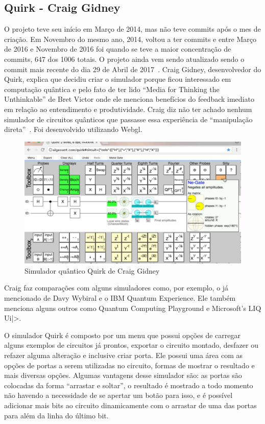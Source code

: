 \documentclass[a4paper, 12pt, oneside]{book}
\begin{document}
\subsection{Quirk - Craig Gidney}

O projeto teve seu início em Março de 2014, mas não teve commits após o mes de criação. Em Novembro do mesmo ano, 2014, voltou a ter commits e entre Março de 2016 e Novembro de 2016 foi quando se teve a maior concentração de commits, 647 dos 1006 totais. O projeto ainda vem sendo atualizado sendo o commit mais recente do dia 29 de Abril de 2017~\cite{gitquirk}. Craig Gidney, desenvolvedor do Quirk, explica que decidiu criar o simulador porque ficou interessado em computação quântica e pelo fato de ter lido ``Media for Thinking the Unthinkable'' de Bret Victor onde ele menciona benefícios do feedback imediato em relação ao entendimento e produtividade. Craig diz não ter achado nenhum simulador de circuitos quânticos que passasse essa experiência de ``manipulação direta''~\cite{quirk}. Foi desenvolvido utilizando Webgl.

\begin{figure}[hbtp]
\centering
\includegraphics[scale=0.36]{quirk.jpg}
\caption{Simulador quântico Quirk de Craig Gidney}
\end{figure}

Craig faz comparações com alguns simuladores como, por exemplo, o já mencionado de Davy Wybiral e o IBM Quantum Experience. Ele também menciona alguns outros como Quantum Computing Playground e Microsoft's LIQ Ui|>.

O simulador Quirk é composto por um menu que possui opções de carregar alguns exemplos de circuitos já prontos, exportar o circuito montado, desfazer ou refazer alguma alteração e inclusive criar porta. Ele possui uma área com as opções de portas a serem utilizadas no circuito, formas de mostrar o resultado e mais diversas opções. Algumas vantagens desse simulador são: as portas são colocadas da forma ``arrastar e soltar'', o resultado é mostrado a todo momento não havendo a necessidade de se apertar um botão para isso, e é possível adicionar mais bits ao circuito dinamicamente com o arrastar de uma das portas para além da linha do último bit.
\end{document}
